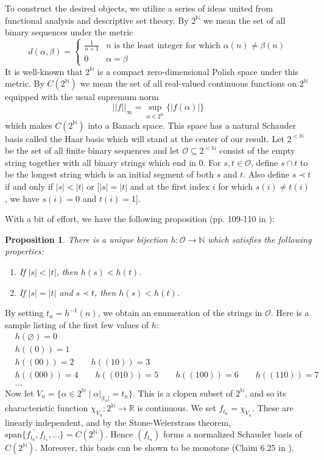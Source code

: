 \documentclass{article}
\newtheorem{proposition}[theorem]{Proposition}
\newcommand{\spn}{\text{span}}
\newcommand{\N}{\mathbb N}
\newcommand{\R}{\mathbb R}
\begin{document}
To construct the desired objects, we utilize a series of ideas united from functional analysis and descriptive set theory. By $2^\N$ we mean the set of all binary sequences under the metric 
\begin{equation*}
d(\alpha,\beta) = \begin{cases}
\frac{1}{n+1} & n \text{ is the least integer for which $\alpha(n)\neq\beta(n)$}\\
0 & \alpha = \beta
\end{cases}
\end{equation*}
It is well-known that $2^\N$ is a compact zero-dimensional Polish space under this metric. By $C(2^\N)$ we mean the set of all real-valued continuous functions on $2^\N$ equipped with the usual supremum norm
\begin{equation*}
||f||_\infty = \sup_{\alpha\in 2^\N} \{|f(\alpha)|\}
\end{equation*}
which makes $C(2^\N)$ into a Banach space. This space has a natural Schauder basis called the Haar basis which will stand at the center of our result. Let $2^{<\N}$ be the set of all finite binary sequences and let $\mathcal O\subseteq 2^{<\N}$ consist of the empty string together with all binary strings which end in 0. For $s,t\in \mathcal O$, define $s\cap t$ to be the longest string which is an initial segment of both $s$ and $t$. Also define $s \prec t$ if and only if $|s| < |t|$ or [$|s| = |t|$ and at the first index $i$ for which $s(i)\neq t(i)$, we have $s(i) = 0$ and $t(i) = 1$].

With a bit of effort, we have the following proposition (pp. 109-110 in \cite{D}):

\begin{proposition}
There is a unique bijection $h : \mathcal O\rightarrow\N$ which satisfies the following properties:
\begin{enumerate}
\item If $|s| < |t|$, then $h(s) < h(t)$.
\item If $|s|=|t|$ and $s \prec t$, then $h(s) < h(t)$.
\end{enumerate}
\end{proposition}

By setting $t_n = h^{-1}(n)$, we obtain an enumeration of the strings in $\mathcal O$. Here is a sample listing of the first few values of $h$:
\begin{align*}
&h(\varnothing) = 0 \\
& h((0)) = 1 \\
&h((00)) = 2 \qquad  h((10)) = 3 \\ 
&h((000)) = 4 \qquad h((010))=5 \qquad h((100)) = 6 \qquad h((110))=7 \qquad \\
&\ldots
\end{align*}
Now let $V_n = \{\alpha\in 2^\N\mid \alpha|_{|t_n|} = t_n\}$. This is a clopen subset of $2^\N$, and so its characteristic function $\chi_{V_n} : 2^\N\rightarrow\R$ is continuous. We set $f_{t_n} = \chi_{V_n}$. These are linearly independent, and by the Stone-Weierstrass theorem, $\overline{\spn\{f_{t_0}, f_{t_1},\ldots\}} = C(2^\N)$. Hence $(f_{t_n})$ forms a normalized Schauder basis of $C(2^\N)$. Moreover, this basis can be shown to be monotone (Claim 6.25 in \cite{D}).
\end{document}
